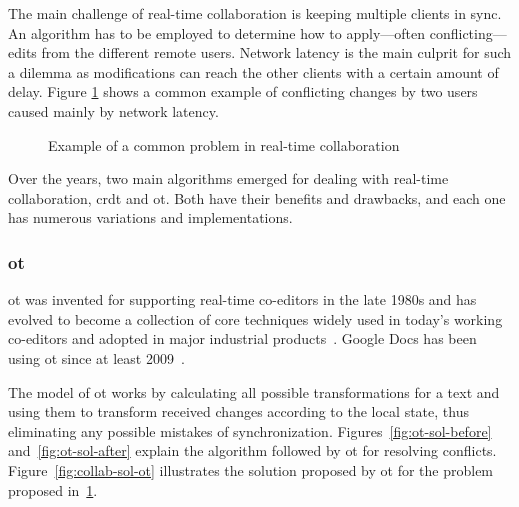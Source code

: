 \begin{toexclude}
  The main challenge of real-time collaboration is keeping multiple clients in sync.
  An algorithm has to be employed to determine how to apply---often conflicting---edits from the different remote users.
  Network latency is the main culprit for such a dilemma as modifications can reach the other clients with a certain amount of delay.
  Figure \ref{fig:collab-problem} shows a common example of conflicting changes by two users caused mainly by network latency.

  \begin{figure}[H]
    \centerfloat
    \sffamily

    \caption{Example of a common problem in real-time collaboration}
    \label{fig:collab-problem}
  \end{figure}

  Over the years, two main algorithms emerged for dealing with real-time collaboration, \acrfull{crdt} and \acrfull{ot}.
  Both have their benefits and drawbacks, and each one has numerous variations and implementations.

  \subsubsection{\acrfull{ot}}

  \acrlong{ot} was invented for supporting real-time co-editors in the late 1980s and has evolved to become a collection of core techniques widely used in today's working co-editors and adopted in major industrial products~\autocite{sun_real_2020}.
  Google Docs has been using \acrshort{ot} since at least 2009~\autocite{noauthor_whats_nodate}.

  The model of \acrlong{ot} works by calculating all possible transformations for a text and using them to transform received changes according to the local state, thus eliminating any possible mistakes of synchronization.
  Figures~\ref{fig:ot-sol-before} and~\ref{fig:ot-sol-after} explain the algorithm followed by \acrshort{ot} for resolving conflicts.
  Figure~\ref{fig:collab-sol-ot} illustrates the solution proposed by \acrshort{ot} for the problem proposed in~\ref{fig:collab-problem}.



\end{toexclude}
